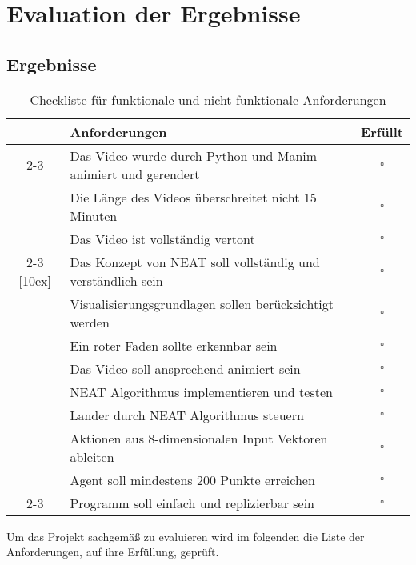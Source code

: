 \chapter{Evaluation der Ergebnisse}
\label{chapter:4}
\section{Ergebnisse}
\begin{table}[h]
	\centering
	\begin{tabularx}{\textwidth}{|c|X|c|}
		\hline
		\multirow{34}{*}[4ex]{\rotatebox[origin=c]{90}{\centering \textbf{Visualisierung}}} & \textbf{Anforderungen} & \textbf{Erfüllt} \\
		\cline{2-3}
		& Das Video wurde durch Python und Manim animiert und gerendert & $\square$ \\[4ex]
		& Die Länge des Videos überschreitet nicht 15 Minuten & $\square$ \\[4ex]
		& Das Video ist vollständig vertont & $\square$ \\[4ex]
		\cline{2-3}
		\multirow{44}{*}[10ex]{\rotatebox[origin=c]{90}{\centering \textbf{Implementierung}}} & Das Konzept von NEAT soll vollständig und verständlich sein & $\square$ \\[4ex]
		& Visualisierungsgrundlagen sollen berücksichtigt werden & $\square$ \\[4ex]
		& Ein roter Faden sollte erkennbar sein & $\square$ \\[4ex]
		& Das Video soll ansprechend animiert sein & $\square$ \\[4ex]
		\hline
		& NEAT Algorithmus implementieren und testen & $\square$ \\[4ex]
		& Lander durch NEAT Algorithmus steuern & $\square$ \\[4ex]
		& Aktionen aus 8-dimensionalen Input Vektoren ableiten & $\square$ \\[4ex]
		& Agent soll mindestens 200  Punkte erreichen & $\square$ \\[4ex]
		\cline{2-3}
		& Programm soll einfach und replizierbar sein & $\square$ \\[4ex]
		\hline
	\end{tabularx}
	\caption{Checkliste für funktionale und nicht funktionale Anforderungen}
\end{table}

Um das Projekt sachgemäß zu evaluieren wird im folgenden die Liste der Anforderungen, auf ihre Erfüllung, geprüft. 

